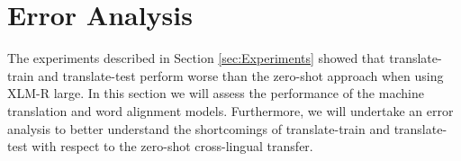 \documentclass[11pt]{article}
\begin{document}
\begin{table}[tbp]
    \centering
    \small
    \caption{Comparison between the previous research methods that leverage projections, the zero-shot baselines and our annotation projections in the 2002-2003 NER CoNLL datasets. F1 score reported}\label{tab:zerovsSota}
\end{table}


\section{Error Analysis}
\label{sec:ErrorAnalisis}

The experiments described in Section \ref{sec:Experiments} showed that translate-train and translate-test perform worse than the zero-shot approach when using XLM-R large. In this section we will assess the performance of the machine translation and word alignment models. Furthermore, we will undertake an error analysis to better understand the shortcomings of translate-train and translate-test with respect to the zero-shot cross-lingual transfer.
\end{document}
